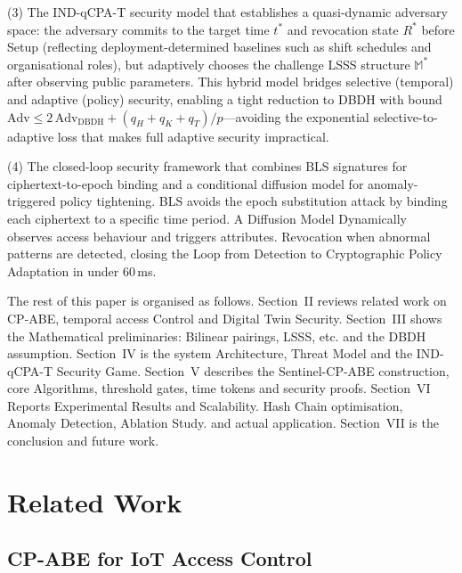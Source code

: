 \documentclass[lettersize,journal]{IEEEtran}
\begin{document}
(3) The IND-qCPA-T security model that establishes a quasi-dynamic
adversary space: the adversary commits to the target time $t^*$ and
revocation state $R^*$ before Setup (reflecting deployment-determined
baselines such as shift schedules and organisational roles), but adaptively
chooses the challenge LSSS structure $\mathbb{M}^*$ after observing public
parameters. This hybrid model bridges selective (temporal) and adaptive
(policy) security, enabling a tight reduction to DBDH with bound
$\text{Adv} \leq 2\,\text{Adv}_{\text{DBDH}} + (q_H + q_K + q_T)/p$---avoiding the exponential
selective-to-adaptive loss that makes full adaptive security impractical.

(4) The closed-loop security framework that combines BLS signatures
for ciphertext-to-epoch binding and a conditional diffusion model for
anomaly-triggered policy tightening. BLS avoids the epoch substitution attack by binding
each ciphertext to a specific time period. A Diffusion Model
Dynamically observes access behaviour and triggers attributes.
Revocation when abnormal patterns are detected, closing the
Loop from Detection to Cryptographic Policy Adaptation in
under $60$\,ms.

The rest of this paper is organised as follows. Section~II reviews
related work on CP-ABE, temporal access Control and Digital Twin Security.
Section~III shows the Mathematical preliminaries: Bilinear pairings, LSSS, etc.
and the DBDH assumption. Section~IV is the system Architecture, Threat Model
and the IND-qCPA-T Security Game. Section~V describes the Sentinel-CP-ABE
construction, core Algorithms, threshold gates, time tokens and security proofs.
Section~VI Reports Experimental Results and Scalability. Hash Chain optimisation,
Anomaly Detection, Ablation Study. and actual application. Section~VII is the
conclusion and future work.

\section{Related Work}
\label{sec:related}


\subsection{CP-ABE for IoT Access Control}
\label{subsec:cpabe_iot}
\end{document}
